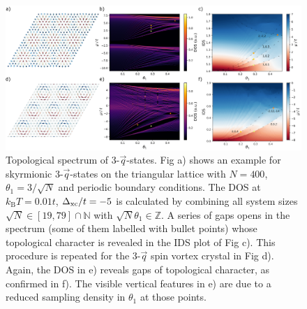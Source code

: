 \documentclass[
    10pt,
    aps,
    prl,
    twocolumn,
    floatfix,
    superscriptaddress
]{revtex4-2}
\begin{document}

\begin{figure}[t]
 \centering
 \includegraphics[width=0.85\linewidth]{../gfx/figure_02/figure_02.png}
 \caption{
     Topological spectrum of 3-$\vec{q}$-states.
     Fig a) shows an example for skyrmionic 3-$\vec{q}$-states on the triangular lattice with $N=400$, $\theta_1 = 3/\sqrt{N}$ and periodic boundary conditions.
     The DOS at $k_\mathrm{B}T = 0.01t$, $\Delta_\mathrm{xc} / t=-5$ is calculated by combining all system sizes $\sqrt{N} \in [19,79]\cap \mathbb{N}$ with  $\sqrt{N}\theta_1 \in \mathbb{Z}$.
     A series of gaps opens in the spectrum (some of them labelled with bullet points) whose topological character is revealed in the IDS plot of Fig c).
     This procedure is repeated for the 3-$\vec{q}$ spin vortex crystal in Fig d).
    Again, the DOS in e) reveals gaps of topological character, as confirmed in f).
    The visible vertical features in e) are due to a reduced sampling density in $\theta_1$ at those points. 
 }  
 \label{fig:three_q_states}
\end{figure}



\end{document}
